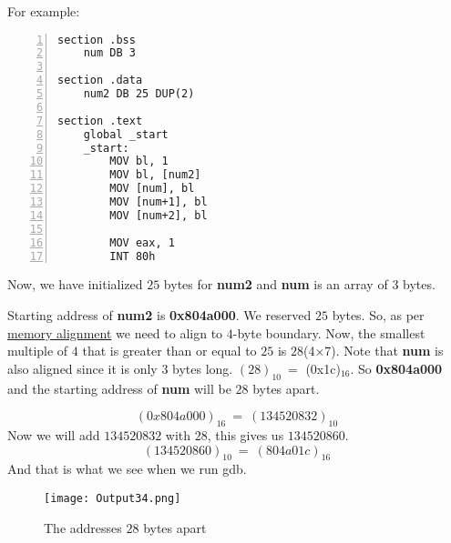 \documentclass{article}
\begin{document}
\vspace{10pt}
For example:
\begin{Verbatim}[numbers=left, frame=single]
section .bss
	num DB 3
	
section .data
	num2 DB 25 DUP(2)

section .text
	global _start
	_start:
		MOV bl, 1
		MOV bl, [num2]
		MOV [num], bl
		MOV [num+1], bl
		MOV [num+2], bl
		
		MOV eax, 1
		INT 80h
\end{Verbatim}
Now, we have initialized $25$ bytes for \textbf{num2} and \textbf{num} is an array of $3$ bytes.

Starting address of \textbf{num2} is \textbf{0x804a000}. We reserved $25$ bytes. So, as per \href{https://youtu.be/OKjOZBaKlOc?si=MfDv0w7Zp7E7uQI0}{memory alignment} we need to align to $4$-byte boundary. Now, the smallest multiple of $4$ that is greater than or equal to $25$ is $28$(4$\times$7). Note that \textbf{num} is also aligned since it is only $3$ bytes long. $(28)_{10}\ =$ (0x1c)$_{16}$. So \textbf{0x804a000} and the starting address of \textbf{num} will be $28$ bytes apart.

$$
(0x804a000)_{16}\ =\ (134520832)_{10}
$$
\newpage
Now we will add $134520832$ with $28$, this gives us $134520860$.
$$
(134520860)_{10}\ =\ (804a01c)_{16}
$$
And that is what we see when we run gdb.
\begin{figure}[h]
	\centering
	\texttt{[image: Output34.png]}
	\caption{The addresses $28$ bytes apart}
	\label{fig:fig4}
\end{figure}
\end{document}

